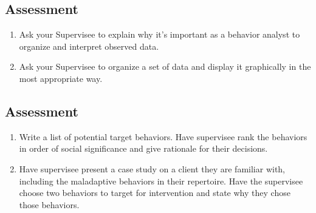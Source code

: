 \subsection{Assessment}
\begin{enumerate}
\item Ask your Supervisee to explain why it's important as a behavior analyst to organize and interpret observed data. 
\item Ask your Supervisee to organize a set of data and display it graphically in the most appropriate way. 
\end{enumerate}
%
\subsection{Assessment}
\begin{enumerate}
\item Write a list of potential target behaviors. Have supervisee rank the behaviors in order of social significance and give rationale for their decisions.
\item Have supervisee present a case study on a client they are familiar with, including the maladaptive behaviors in their repertoire. Have the supervisee choose two behaviors to target for intervention and state why they chose those behaviors.
\end{enumerate}
%
